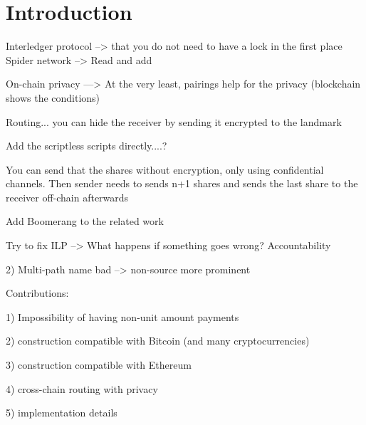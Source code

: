 \section{Introduction}

Interledger protocol --> that you do not need to have a lock in the first place
Spider network --> Read and add

On-chain privacy ---> At the very least, pairings help for the privacy (blockchain shows the conditions)

Routing... you can hide the receiver by sending it encrypted to the landmark

Add the scriptless scripts directly....?

You can send that the shares without encryption, only using confidential channels. Then sender needs to sends n+1 shares and sends the last share to the receiver off-chain afterwards

Add Boomerang to the related work

Try to fix ILP --> What happens if something goes wrong? Accountability


 2) Multi-path name bad --> non-source more prominent

Contributions:


 1) Impossibility of having non-unit amount payments

 2) construction compatible with Bitcoin (and many cryptocurrencies)

 3) construction compatible with Ethereum 

 4) cross-chain routing with privacy

 5) implementation details